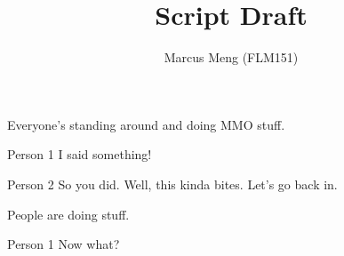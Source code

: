 \documentclass{screenplay}[2006/11/15]
\title{Script Draft}
\author{Marcus Meng (FLM151)}
\begin{document}
\coverpage

\fadein


Everyone's standing around and doing MMO stuff.

\begin{dialogue}{Person 1}
	 I said something!
\end{dialogue}

\begin{dialogue}{Person 2}
	So you did.  Well, this kinda bites. Let's go back in.
\end{dialogue}


People are doing stuff.

\begin{dialogue}{Person 1}
	Now what?
\end{dialogue}

\fadeout

\theend
\end{document}
